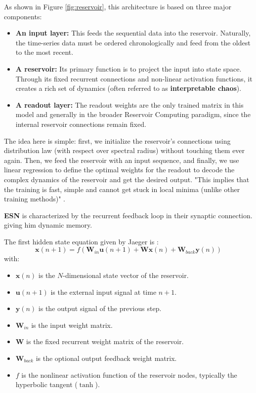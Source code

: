 As shown in Figure \ref{fig:reservoir}, this architecture is based on three major components:
 \begin{itemize}
     \item \textbf{An input layer:} This feeds the sequential data into the reservoir. Naturally, the time-series data must be ordered chronologically and feed from the oldest to the most recent.
     \item \textbf{A reservoir:} Its primary function is to project the input into state space. Through its fixed recurrent connections and non-linear activation functions, it creates a rich set of dynamics (often referred to as \textbf{interpretable chaos}).
     \item \textbf{A readout layer:} The readout weights are the only trained matrix in this model and generally in the broader Reservoir Computing paradigm, since the internal reservoir connections remain fixed.
 \end{itemize}
 
The idea here is simple: first, we initialize the reservoir's connections using distribution law (with respect over spectral radius) without touching them ever again. Then, we feed the reservoir with an input sequence, and finally, we use linear regression to define the optimal weights for the readout to decode the complex dynamics of the reservoir and get the desired output. "This implies that the training is fast, simple and cannot get stuck in local minima (unlike other training methods)" \cite{holzmann2010echo}.

\textbf{ESN} is characterized by the recurrent feedback loop in their synaptic connection. \cite{jaeger2004harnessing} giving him dynamic memory.

\vspace{0.5cm}

The first hidden state equation given by Jaeger is :
\begin{equation}
    \mathbf{x}(n+1) = f(\mathbf{W}_{in} \mathbf{u}(n+1) + \mathbf{W} \mathbf{x}(n) + \mathbf{W}_{back} \mathbf{y}(n))
\end{equation}
with:
\begin{itemize}
    \item $\mathbf{x}(n)$ is the $N$-dimensional state vector of the reservoir.
    \item $\mathbf{u}(n+1)$ is the external input signal at time $n+1$.
    \item $\mathbf{y}(n)$ is the output signal of the previous step.
    \item $\mathbf{W}_{in}$ is the input weight matrix.
    \item $\mathbf{W}$ is the fixed recurrent weight matrix of the reservoir.
    \item $\mathbf{W}_{back}$ is the optional output feedback weight matrix.
    \item $f$ is the nonlinear activation function of the reservoir nodes, typically the hyperbolic tangent ($\tanh$).
\end{itemize}

